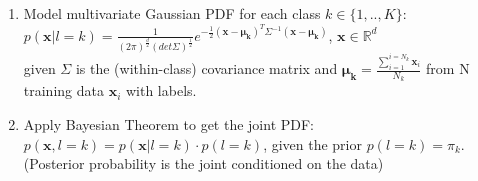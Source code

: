 \documentclass[11pt]{article}
\newcommand{\R}{\mathbb{R}}
\begin{document}
\begin{enumerate}
    \item Model multivariate Gaussian PDF for each class $k \in \{1,..,K\}$:\\
    $p(\mathbf{x}|l=k) = \frac{1}{{(2\pi)}^{\frac{d}{2}} {(det\Sigma)}^{\frac{1}{2}}} e^{-\frac{1}{2}{(\mathbf{x}-\mathbf{\mu_k})}^T \Sigma^{-1}{(\mathbf{x}-\mathbf{\mu_k})}}$, $\mathbf{x} \in \R^d$\\
    given $\Sigma$ is the (within-class) covariance matrix and $\mathbf{\mu_k} = \frac{\sum_{i=1}^{i=N_k} \mathbf{x}_i}{N_k}$ from N training data $\mathbf{x}_i$ with labels. 
    
    \item Apply Bayesian Theorem to get the joint PDF: $p(\mathbf{x}, l=k) = p(\mathbf{x}|l=k) \cdot p(l=k)$, given the prior $p(l=k) = \pi_k$. (Posterior probability is the joint conditioned on the data)
    

\end{enumerate}
\end{document}

